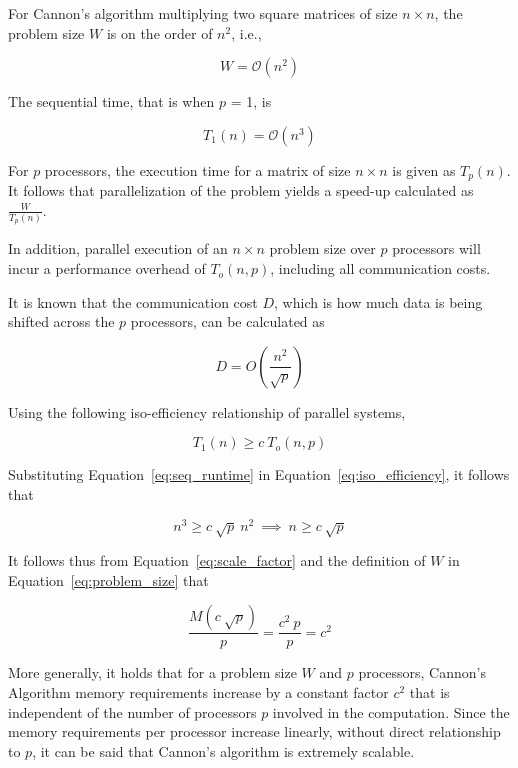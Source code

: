 \documentclass[bdcc,article,submit,moreauthors,pdftex]{Definitions/mdpi}
\begin{document}
For Cannon's algorithm multiplying two square matrices of size $n \times n$, the problem size $W$ is on the order of $n^2$, i.e.,

\begin{equation}
	W = \mathcal{O}(n^2)
	\label{eq:problem_size}
\end{equation}

The sequential time, that is when $p$ = 1, is 

\begin{equation}
	T_1(n) = \mathcal{O}(n^3)
	\label{eq:seq_runtime}
\end{equation}

For $p$ processors, the execution time for a matrix of size $n \times n$ is given as $T_p (n)$. It follows that parallelization of the problem yields a speed-up calculated as $\frac{W}{T_p (n)}$. 

In addition, parallel execution of an $n \times n$ problem size over $p$ processors will incur a performance overhead of $T_o(n, p)$, including all communication costs. 

It is known that the communication cost $D$, which is how much data is being shifted across the $p$ processors, can be calculated as 

\begin{equation}
	D = O(\frac{n^2}{\sqrt{p}})
\end{equation}

\noindent Using the following iso-efficiency relationship of parallel systems,  

\begin{equation}
	T_1(n) \geq c \ T_o(n, p)
	\label{eq:iso_efficiency}
\end{equation}

\noindent Substituting Equation~\eqref{eq:seq_runtime} in Equation~\eqref{eq:iso_efficiency}, it follows that

\begin{equation}
	n^3 \geq c \ \sqrt{p} \ n^2 \ \implies \ n \geq c \ \sqrt{p}
	\label{eq:scale_factor}
\end{equation}

\noindent It follows thus from Equation~\eqref{eq:scale_factor} and the definition of $W$ in Equation~\eqref{eq:problem_size} that

\begin{equation}
	\frac{M(c \ \sqrt{p})}{p} = \frac{c^2 \ p}{p} = c^2
\end{equation}

More generally, it holds that for a problem size $W$ and $p$ processors, Cannon's Algorithm memory requirements increase by a constant factor $c^2$ that is independent of the number of processors $p$ involved in the computation.  Since the memory requirements per processor increase linearly, without direct relationship to $p$, it can be said that Cannon's algorithm is extremely scalable. 
\end{document}
